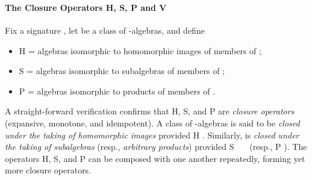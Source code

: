 \begin{code}
\AgdaSymbol{\{}\AgdaSpace{}%
\AgdaSymbol{=}\AgdaSpace{}%
\AgdaSymbol{\}}\<%
\\
%
\>[1]\AgdaSpace{}%
\AgdaSymbol{(}%
\>[20]\AgdaSymbol{\{}\AgdaSpace{}%
\AgdaSymbol{=}\AgdaSpace{}%
\AgdaSymbol{\}\{}\AgdaSymbol{\}}%
\>[35]%
\>[44]\AgdaSymbol{)}\AgdaSpace{}%
\AgdaSymbol{=}\AgdaSpace{}%
%
\>[56]\AgdaSpace{}%
\AgdaSymbol{\{}\AgdaSpace{}%
\AgdaSymbol{=}\AgdaSpace{}%
\AgdaSymbol{\}\{}\AgdaSymbol{\}}%
\>[84]\AgdaSymbol{(}\AgdaSpace{}%
\AgdaSymbol{)}\<%
\\
%
\>[1]\AgdaSpace{}%
\AgdaSymbol{(}%
\>[20]\AgdaSymbol{\{}\AgdaSpace{}%
\AgdaSymbol{=}\AgdaSpace{}%
\AgdaSymbol{\}\{}\AgdaSymbol{\}\{}\AgdaSymbol{\}}%
\>[35]\AgdaSpace{}%
%
\>[44]\AgdaSymbol{)}\AgdaSpace{}%
\AgdaSymbol{=}\AgdaSpace{}%
%
\>[56]\AgdaSpace{}%
\AgdaSymbol{\{}\AgdaSpace{}%
\AgdaSymbol{=}\AgdaSpace{}%
\AgdaSymbol{\}\{}\AgdaSymbol{\}\{}\AgdaSymbol{\}}%
\>[84]\AgdaSymbol{(}\AgdaSpace{}%
\AgdaSymbol{)(}\AgdaSpace{}%
\AgdaSymbol{)}\<%
\end{code}
\fi

\paragraph*{The Closure Operators H, S, P and V}
Fix a signature , let  be a class of -algebras, and define
\begin{itemize}
\item \af H  = algebras isomorphic to homomorphic images of members of ;
\item \af S  = algebras isomorphic to subalgebras of members of ;
\item \af P  = algebras isomorphic to products of members of .
\end{itemize}
\ifshort\else
A straight-forward verification confirms that
\fi
\af H, \af S, and \af P are \emph{closure operators} (expansive, monotone, and
idempotent).  A class  of -algebras is said to be \emph{closed under
the taking of homomorphic images} provided \af H   . Similarly,  is
\emph{closed under the taking of subalgebras} (resp., \emph{arbitrary products}) provided
\af S~~~ (resp., \af P   ). The operators \af H, \af
S, and \af P can be composed with one another repeatedly, forming yet more closure
operators.

